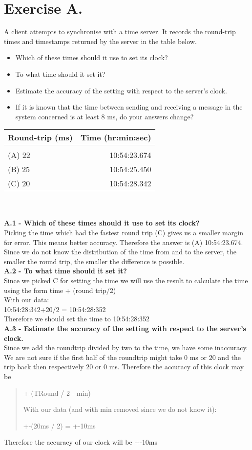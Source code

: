 \section{Exercise A.}
A client attempts to synchronise with a time server. It records the round-trip times and timestamps returned by the server in the table below.\\
\begin{itemize}
\item Which of these times should it use to set its clock? 
\item To what time should it set it? 
\item Estimate the accuracy of the setting with respect to the server’s clock. 
\item If it is known that the time between sending and receiving a message in the system concerned is at least 8 ms, do your answers change?
\end{itemize}
\begin{tabular}{ l | r }
Round-trip (ms) & Time (hr:min:sec) \\[0.1cm]
\hline \\
(A) 22 & 10:54:23.674 \\[0.1cm]
(B) 25 & 10:54:25.450 \\[0.1cm]
(C) 20 & 10:54:28.342 \\[0.1cm]
\hline 
\end{tabular}\\\\

\textbf{A.1 - Which of these times should it use to set its clock?}\\
Picking the time which had the fastest round trip (C) gives us a smaller margin for error. This means better accuracy. Therefore the answer is (A) 10:54:23.674. Since we do not know the distribution of the time from and to the server, the smaller the round trip, the smaller the difference is possible.\\

\textbf{A.2 - To what time should it set it?}\\
Since we picked C for setting the time we will use the result to calculate the time using the form
time + (round trip/2)\\
With our data:\\
10:54:28:342+20/2 = 10:54:28:352\\
Therefore we should set the time to 10:54:28:352\\

\textbf{A.3 - Estimate the accuracy of the setting with respect to the server’s clock.}\\
Since we add the roundtrip divided by two to the time, we have some inaccuracy. We are not sure if the first half of the roundtrip might take 0 ms or 20 and the trip back then respectively 20 or 0 ms. Therefore the accuracy of this clock may be 
\begin{quote}
+-(TRound / 2 - min)

With our data (and with min removed since we do not know it):

+-(20ms / 2) = +-10ms
\end{quote}
Therefore the accuracy of our clock will be +-10ms\\

